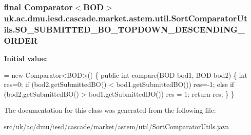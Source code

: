 \hypertarget{classuk_1_1ac_1_1dmu_1_1iesd_1_1cascade_1_1market_1_1astem_1_1util_1_1_sort_comparator_utils_ae94946e7ab7af8fe3233f7861f595a52}{
\subsubsection[{S\-O\-\_\-\-S\-U\-B\-M\-I\-T\-T\-E\-D\-\_\-\-B\-O\-\_\-\-T\-O\-P\-D\-O\-W\-N\-\_\-\-D\-E\-S\-C\-E\-N\-D\-I\-N\-G\-\_\-\-O\-R\-D\-E\-R}]{\setlength{\rightskip}{0pt plus 5cm}final Comparator$<${\bf B\-O\-D}$>$ uk.\-ac.\-dmu.\-iesd.\-cascade.\-market.\-astem.\-util.\-Sort\-Comparator\-Utils.\-S\-O\-\_\-\-S\-U\-B\-M\-I\-T\-T\-E\-D\-\_\-\-B\-O\-\_\-\-T\-O\-P\-D\-O\-W\-N\-\_\-\-D\-E\-S\-C\-E\-N\-D\-I\-N\-G\-\_\-\-O\-R\-D\-E\-R\hspace{0.3cm}{\ttfamily [static]}}}\label{classuk_1_1ac_1_1dmu_1_1iesd_1_1cascade_1_1market_1_1astem_1_1util_1_1_sort_comparator_utils_ae94946e7ab7af8fe3233f7861f595a52}
{\bfseries Initial value\-:}
\begin{DoxyCode}
=    \textcolor{keyword}{new} Comparator<BOD>() \{
        \textcolor{keyword}{public} \textcolor{keywordtype}{int} compare(BOD bod1, BOD bod2) \{
            \textcolor{keywordtype}{int} res=0;
            \textcolor{keywordflow}{if} (bod2.getSubmittedBO() < bod1.getSubmittedBO())
                res=-1;
            \textcolor{keywordflow}{else} \textcolor{keywordflow}{if} (bod2.getSubmittedBO() > bod1.getSubmittedBO())
                res = 1;
            \textcolor{keywordflow}{return} res;
        \}
    \}
\end{DoxyCode}


The documentation for this class was generated from the following file\-:\begin{DoxyCompactItemize}
\item 
src/uk/ac/dmu/iesd/cascade/market/astem/util/Sort\-Comparator\-Utils.\-java\end{DoxyCompactItemize}
